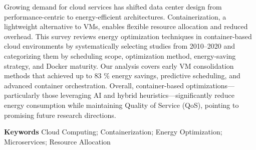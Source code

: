 Growing demand for cloud services has shifted data center design from performance-centric to energy-efficient architectures. Containerization, a lightweight alternative to VMs, enables flexible resource allocation and reduced overhead. This survey reviews energy optimization techniques in container-based cloud environments by systematically selecting studies from 2010–2020 and categorizing them by scheduling scope, optimization method, energy-saving strategy, and Docker maturity. Our analysis covers early VM consolidation methods that achieved up to 83 \% energy savings, predictive scheduling, and advanced container orchestration. Overall, container-based optimizations—particularly those leveraging AI and hybrid heuristics—significantly reduce energy consumption while maintaining Quality of Service (QoS), pointing to promising future research directions.

\textbf{Keywords} 
Cloud Computing; Containerization; Energy Optimization; Microservices; Resource Allocation
